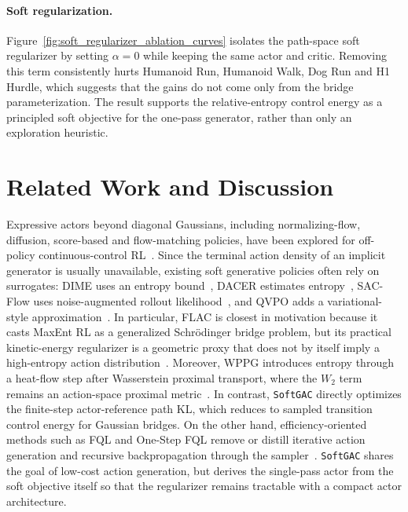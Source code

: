 \documentclass[11pt]{article}
\newcommand{\myalgo}{\texttt{SoftGAC}\xspace}
\begin{document}
\paragraph{Soft regularization.}
Figure~\ref{fig:soft_regularizer_ablation_curves} isolates the path-space soft regularizer by setting $\alpha=0$ while keeping the same actor and critic. Removing this term consistently hurts Humanoid Run, Humanoid Walk, Dog Run and H1 Hurdle, which suggests that the gains do not come only from the bridge parameterization. The result supports the relative-entropy control energy as a principled soft objective for the one-pass generator, rather than only an exploration heuristic.

\section{Related Work and Discussion}

Expressive actors beyond diagonal Gaussians, including normalizing-flow, diffusion, score-based and flow-matching policies, have been explored for off-policy continuous-control RL~\citep{NormalizingFlowRL24,DDiffPG24,QSM24,QVPO24,FlowRL25, ReinFlow25}. Since the terminal action density of an implicit generator is usually unavailable, existing soft generative policies often rely on surrogates: DIME uses an entropy bound~\citep{DIME25}, DACER estimates entropy~\citep{ACER24}, SAC-Flow uses noise-augmented rollout likelihood~\citep{SACFlow26}, and QVPO adds a variational-style approximation~\citep{QVPO24}. In particular, FLAC is closest in motivation because it casts MaxEnt RL as a generalized Schr\"odinger bridge problem, but its practical kinetic-energy regularizer is a geometric proxy that does not by itself imply a high-entropy action distribution~\citep{FLAC26}. Moreover, WPPG introduces entropy through a heat-flow step after Wasserstein proximal transport, where the $W_2$ term remains an action-space proximal metric~\citep{WPPG26}. In contrast, \myalgo directly optimizes the finite-step actor-reference path KL, which reduces to sampled transition control energy for Gaussian bridges. On the other hand, efficiency-oriented methods such as FQL and One-Step FQL remove or distill iterative action generation and recursive backpropagation through the sampler~\citep{FQL25,OFQL26}. \myalgo shares the goal of low-cost action generation, but derives the single-pass actor from the soft objective itself so that the regularizer remains tractable with a compact actor architecture.
\end{document}
